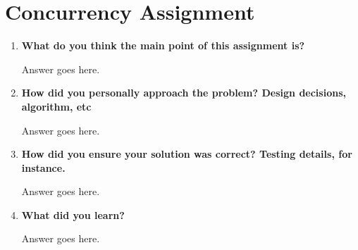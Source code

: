\documentclass[letterpaper,10pt,titlepage,draftclsnofoot,onecolumn]{IEEEtran}
\begin{document}
\section{Concurrency Assignment}
\begin{enumerate}
\item \textbf{What do you think the main point of this assignment is?}

Answer goes here.

\item \textbf{How did you personally approach the problem? Design decisions, algorithm, etc}

Answer goes here.

\item \textbf{How did you ensure your solution was correct? Testing details, for instance.}

Answer goes here.

\item \textbf{What did you learn?}

Answer goes here.

\end{enumerate}

\nocite{*}



\end{document}
